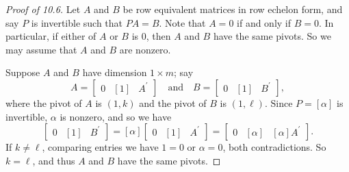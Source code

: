 \documentclass{memoir}
\begin{document}
\begin{proof}[Proof of 10.6]
Let $A$ and $B$ be row equivalent matrices in row echelon form, and say $P$ is invertible such that $PA = B$. Note that $A = 0$ if and only if $B = 0$. In particular, if either of $A$ or $B$ is 0, then $A$ and $B$ have the same pivots. So we may assume that $A$ and $B$ are nonzero.

Suppose $A$ and $B$ have dimension $1 \times m$; say \[A = \left[ \begin{array}{c|c|c} 0 & [1] & A^\prime \end{array} \right] \quad \mathrm{and} \quad B = \left[ \begin{array}{c|c|c} 0 & [1] & B^\prime \end{array} \right], \] where the pivot of $A$ is $(1,k)$ and the pivot of $B$ is $(1,\ell)$. Since $P = [\alpha]$ is invertible, $\alpha$ is nonzero, and so we have \[ \left[ \begin{array}{c|c|c} 0 & [1] & B^\prime \end{array} \right] = [\alpha] \left[ \begin{array}{c|c|c} 0 & [1] & A^\prime \end{array} \right] = \left[ \begin{array}{c|c|c} 0 & [\alpha] & [\alpha]A^\prime \end{array} \right]. \] If $k \neq \ell$, comparing entries we have $1 = 0$ or $\alpha = 0$, both contradictions. So $k = \ell$, and thus $A$ and $B$ have the same pivots.


\end{proof}
\end{document}
